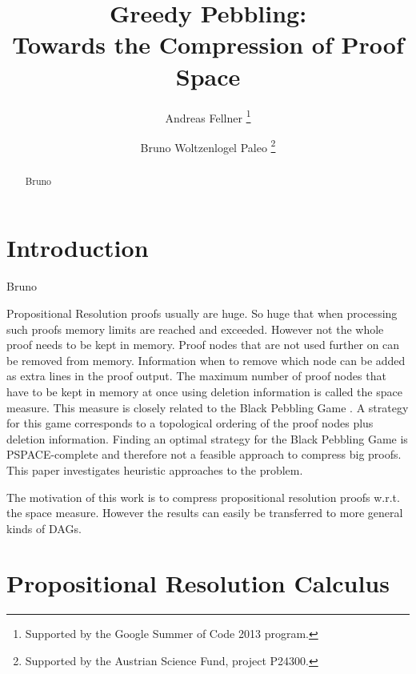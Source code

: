 \documentclass{llncs}
\title{Greedy Pebbling: \\ 
Towards the Compression of Proof Space}
\author{
  Andreas Fellner 
  \thanks{Supported by the Google Summer of Code 2013 program.}
  \and 
  Bruno Woltzenlogel Paleo 
  \thanks{Supported by the Austrian Science Fund, project P24300.}
}
\institute{
  \email{fellner.a@gmail.com} \ \ \ \email{bruno@logic.at} \\
  Theory and Logic Group \\
  Institute for Computer Languages \\
  Vienna University of Technology
}
\begin{document}
\maketitle

\begin{abstract}
Bruno
\end{abstract}

\setcounter{footnote}{0}


\section{Introduction}
Bruno

Propositional Resolution proofs usually are huge. So huge that when processing such proofs memory limits are reached and exceeded.
However not the whole proof needs to be kept in memory. 
Proof nodes that are not used further on can be removed from memory.
Information when to remove which node can be added as extra lines in the proof output.
The maximum number of proof nodes that have to be kept in memory at once using deletion information is called the space measure.
This measure is closely related to the Black Pebbling Game \cite{kasai1979classes,gilbert1980pebbling}.
A strategy for this game corresponds to a topological ordering of the proof nodes plus deletion information.
Finding an optimal strategy for the Black Pebbling Game is PSPACE-complete \cite{gilbert1980pebbling} and therefore not a feasible approach to compress big proofs.
This paper investigates heuristic approaches to the problem.

The motivation of this work is to compress propositional resolution proofs w.r.t. the space measure. 
However the results can easily be transferred to more general kinds of DAGs.

\section{Propositional Resolution Calculus}
\end{document}
